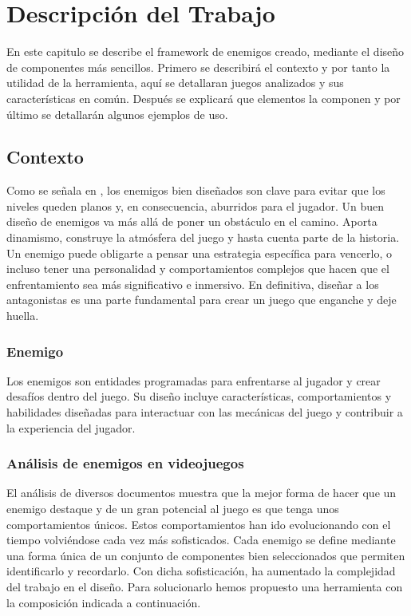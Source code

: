 
\chapter{Descripción del Trabajo}
\label{cap:descripcionTrabajo}
En este capitulo se describe el framework de enemigos creado, mediante el diseño de componentes más sencillos. 
Primero se describirá el contexto y por tanto la utilidad de la herramienta, aquí se detallaran juegos analizados y sus características en común. Después se explicará que elementos la componen y por último se detallarán algunos ejemplos de uso. \\
\section{Contexto}
Como se señala en  \citet{Build_a_Bad_Guy_Workshop}, los enemigos bien diseñados son clave para evitar que los niveles queden planos y, en consecuencia, aburridos para el jugador.
Un buen diseño de enemigos va más allá de poner un obstáculo en el camino. Aporta dinamismo, construye la atmósfera del juego y hasta cuenta parte de la historia. Un enemigo puede obligarte a pensar una estrategia específica para vencerlo, o incluso tener una personalidad y comportamientos complejos que hacen que el enfrentamiento sea más significativo e inmersivo. En definitiva, diseñar a los antagonistas es una parte fundamental para crear un juego que enganche y deje huella.

\subsection{Enemigo}
Los enemigos son entidades programadas para enfrentarse al jugador y crear desafíos dentro del juego. Su diseño incluye características, comportamientos y habilidades diseñadas para interactuar con las mecánicas del juego y contribuir a la experiencia del jugador. \\
\subsection{Análisis de enemigos en videojuegos}
El análisis de diversos documentos muestra que la mejor forma de hacer que un enemigo destaque y de un gran potencial al juego es que tenga unos comportamientos únicos. Estos comportamientos han ido evolucionando con el tiempo volviéndose cada vez más sofisticados. Cada enemigo se define mediante una forma única de un conjunto de componentes bien seleccionados que permiten identificarlo y recordarlo.
Con dicha sofisticación, ha aumentado la complejidad del trabajo en el diseño. Para solucionarlo hemos propuesto una herramienta con la composición indicada a continuación.
